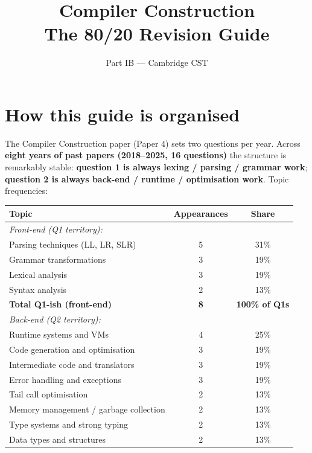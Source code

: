\documentclass[11pt,a4paper]{article}
\title{\vspace{-1.5cm}\textbf{Compiler Construction} \\[2pt] \large The 80/20 Revision Guide}
\author{\small Part IB --- Cambridge CST}
\date{}
\begin{document}
\maketitle
\vspace{-0.8cm}

\section*{How this guide is organised}

The Compiler Construction paper (Paper 4) sets two questions per year. Across \textbf{eight years of past papers (2018--2025, 16 questions)} the structure is remarkably stable: \textbf{question 1 is always lexing / parsing / grammar work}; \textbf{question 2 is always back-end / runtime / optimisation work}. Topic frequencies:

\begin{center}
\begin{tabular}{lcc}
\hline
\textbf{Topic} & \textbf{Appearances} & \textbf{Share} \\
\hline
\multicolumn{3}{l}{\emph{Front-end (Q1 territory):}} \\
Parsing techniques (LL, LR, SLR)   & 5 & 31\% \\
Grammar transformations            & 3 & 19\% \\
Lexical analysis                   & 3 & 19\% \\
Syntax analysis                    & 2 & 13\% \\
\quad \textbf{Total Q1-ish (front-end)} & \textbf{8}  & \textbf{100\% of Q1s} \\
\hline
\multicolumn{3}{l}{\emph{Back-end (Q2 territory):}} \\
Runtime systems and VMs            & 4 & 25\% \\
Code generation and optimisation   & 3 & 19\% \\
Intermediate code and translators  & 3 & 19\% \\
Error handling and exceptions      & 3 & 19\% \\
Tail call optimisation             & 2 & 13\% \\
Memory management / garbage collection & 2 & 13\% \\
Type systems and strong typing     & 2 & 13\% \\
Data types and structures          & 2 & 13\% \\
\hline
\end{tabular}
\end{center}
\end{document}
